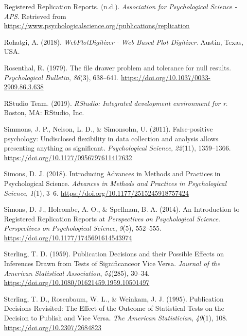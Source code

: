 \documentclass[british,,jou,floatsintext]{apa6}
\begin{document}
\leavevmode\hypertarget{ref-RRRwebsite}{}%
Registered Replication Reports. (n.d.). \emph{Association for Psychological Science - APS}. Retrieved from \url{https://www.psychologicalscience.org/publications/replication}

\leavevmode\hypertarget{ref-Rohatgi2018}{}%
Rohatgi, A. (2018). \emph{WebPlotDigitizer - Web Based Plot Digitizer}. Austin, Texas, USA.

\leavevmode\hypertarget{ref-Rosenthal1979}{}%
Rosenthal, R. (1979). The file drawer problem and tolerance for null results. \emph{Psychological Bulletin}, \emph{86}(3), 638--641. \url{https://doi.org/10.1037/0033-2909.86.3.638}

\leavevmode\hypertarget{ref-RStudioTeam2019}{}%
RStudio Team. (2019). \emph{RStudio: Integrated development environment for r}. Boston, MA: RStudio, Inc.

\leavevmode\hypertarget{ref-Simmons2011}{}%
Simmons, J. P., Nelson, L. D., \& Simonsohn, U. (2011). False-positive psychology: Undisclosed flexibility in data collection and analysis allows presenting anything as significant. \emph{Psychological Science}, \emph{22}(11), 1359--1366. \url{https://doi.org/10.1177/0956797611417632}

\leavevmode\hypertarget{ref-Simons2018}{}%
Simons, D. J. (2018). Introducing Advances in Methods and Practices in Psychological Science. \emph{Advances in Methods and Practices in Psychological Science}, \emph{1}(1), 3--6. \url{https://doi.org/10.1177/2515245918757424}

\leavevmode\hypertarget{ref-Simons2014}{}%
Simons, D. J., Holcombe, A. O., \& Spellman, B. A. (2014). An Introduction to Registered Replication Reports at \emph{Perspectives} \emph{on} \emph{Psychological Science}. \emph{Perspectives on Psychological Science}, \emph{9}(5), 552--555. \url{https://doi.org/10.1177/1745691614543974}

\leavevmode\hypertarget{ref-Sterling1959}{}%
Sterling, T. D. (1959). Publication Decisions and their Possible Effects on Inferences Drawn from Tests of Significanceor Vice Versa. \emph{Journal of the American Statistical Association}, \emph{54}(285), 30--34. \url{https://doi.org/10.1080/01621459.1959.10501497}

\leavevmode\hypertarget{ref-Sterling1995}{}%
Sterling, T. D., Rosenbaum, W. L., \& Weinkam, J. J. (1995). Publication Decisions Revisited: The Effect of the Outcome of Statistical Tests on the Decision to Publish and Vice Versa. \emph{The American Statistician}, \emph{49}(1), 108. \url{https://doi.org/10.2307/2684823}
\end{document}
